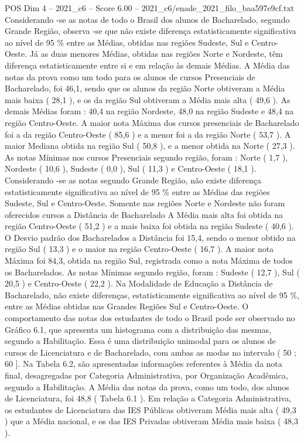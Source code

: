 \begin{textsample}{POS Dim 4 – 2021\_c6 – Score 6.00 – 2021\_c6/enade\_2021\_filo\_baa597e9cf.txt}
Considerando -se as notas de todo o Brasil dos alunos de Bacharelado, segundo Grande Região, observa -se que não existe diferença estatisticamente significativa ao nível de 95 \% entre as Médias, obtidas nas regiões Sudeste, Sul e Centro-Oeste.
Já as duas menores Médias, obtidas nas regiões Norte e Nordeste, têm diferença estatisticamente entre si e em relação às demais Médias.
A Média das notas da prova como um todo para os alunos de cursos Presenciais de Bacharelado, foi 46,1, sendo que os alunos da região Norte obtiveram a Média mais baixa ( 28,1 ), e os da região Sul obtiveram a Média mais alta ( 49,6 ).
As demais Médias foram : 40,4 na região Nordeste, 48,0 na região Sudeste e 48,4 na região Centro-Oeste.
A maior nota Máxima dos cursos presenciais de Bacharelado foi a da região Centro-Oeste ( 85,6 ) e a menor foi a da região Norte ( 53,7 ).
A maior Mediana obtida na região Sul ( 50,8 ), e a menor obtida na Norte ( 27,3 ).
As notas Mínimas nos cursos Presenciais segundo região, foram : Norte ( 1,7 ), Nordeste ( 10,6 ), Sudeste ( 0,0 ), Sul ( 11,3 ) e Centro-Oeste ( 18,1 ).
Considerando -se as notas segundo Grande Região, não existe diferença estatisticamente significativa ao nível de 95 \% entre as Médias das regiões Sudeste, Sul e Centro-Oeste.
Somente nas regiões Norte e Nordeste não foram oferecidos cursos a Distância de Bacharelado A Média mais alta foi obtida na região Centro-Oeste ( 51,2 ) e a mais baixa foi obtida na região Sudeste ( 40,6 ).
O Desvio padrão dos Bacharelados a Distância foi 15,4, sendo o menor obtido na região Sul ( 13,3 ) e o maior na região Centro-Oeste ( 16,7 ).
A maior nota Máxima foi 84,3, obtida na região Sul, registrada como a nota Máxima de todos os Bacharelados.
As notas Mínimas segundo região, foram : Sudeste ( 12,7 ), Sul ( 20,5 ) e Centro-Oeste ( 22,2 ).
Na Modalidade de Educação a Distância de Bacharelado, não existe diferenças, estatisticamente significativa ao nível de 95 \%, entre as Médias obtidas nas Grandes Regiões Sul e Centro-Oeste.
O comportamento das notas dos estudantes de todo o Brasil pode ser observado no Gráfico 6.1, que apresenta um histograma com a distribuição das mesmas, segundo a Habilitação.
Essa é uma distribuição unimodal para os alunos de cursos de Licenciatura e de Bacharelado, com ambas as modas no intervalo ( 50 ; 60 ].
Na Tabela 6.2, são apresentadas informações referentes à Média da nota final, desagregadas por Categoria Administrativa, por Organização Acadêmica, segundo a Habilitação.
A Média das notas da prova, como um todo, dos alunos de Licenciatura, foi 48,8 ( Tabela 6.1 ).
Em relação a Categoria Administrativa, os estudantes de Licenciatura das IES Públicas obtiveram Média mais alta ( 49,3 ) que a Média nacional, e os das IES Privadas obtiveram Média mais baixa ( 48,3 ).

\end{textsample}
